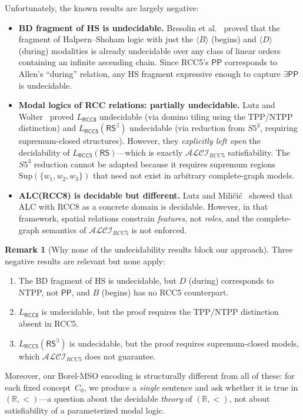 \documentclass[a4paper,11pt]{article}
\theoremstyle{definition}
\newtheorem{remark}[theorem]{Remark}
\newcommand{\ALCIRCC}[1]{\ensuremath{\mathcal{ALCI}_{\mathit{RCC#1}}}}
\newcommand{\PP}{\ensuremath{\mathsf{PP}}}
\newcommand{\reals}{\ensuremath{\mathbb{R}}}
\begin{document}
Unfortunately, the known results are largely negative:
\begin{itemize}[nosep]
  \item \textbf{BD fragment of HS is undecidable.}\; Bresolin et
    al.~\cite{BresolinBD2010} proved that the fragment of
    Halpern--Shoham logic with just the $\langle B\rangle$ (begins)
    and $\langle D\rangle$ (during) modalities is already undecidable
    over any class of linear orders containing an infinite ascending
    chain.  Since RCC5's $\PP$ corresponds to Allen's ``during''
    relation, any HS fragment expressive enough to capture
    $\exists\PP$ is undecidable.
  \item \textbf{Modal logics of RCC relations: partially undecidable.}\;
    Lutz and Wolter~\cite{LutzWolter2006} proved $L_{\mathsf{RCC8}}$
    undecidable (via domino tiling using the TPP/NTPP distinction) and
    $L_{\mathsf{RCC5}}(\mathsf{RS}^{\exists})$ undecidable (via
    reduction from $S5^3$, requiring supremum-closed structures).
    However, they \emph{explicitly left open} the decidability of
    $L_{\mathsf{RCC5}}(\mathsf{RS})$---which is exactly
    $\ALCIRCC{5}$ satisfiability.  The $S5^3$ reduction cannot be
    adapted because it requires supremum regions
    $\mathrm{Sup}(\{w_1,w_2,w_3\})$ that need not exist in arbitrary
    complete-graph models.
  \item \textbf{ALC(RCC8) is decidable but different.}\;
    Lutz and Mili\v{c}i\'{c}~\cite{LutzMilicic2007} showed that
    ALC with RCC8 as a concrete domain is decidable.  However, in
    that framework, spatial relations constrain \emph{features}, not
    \emph{roles}, and the complete-graph semantics of $\ALCIRCC{5}$
    is not enforced.
\end{itemize}

\begin{remark}[Why none of the undecidability results block our approach]
Three negative results are relevant but none apply:
\begin{enumerate}[nosep]
  \item The BD fragment of HS is undecidable, but $D$ (during)
    corresponds to NTPP, not $\PP$, and $B$ (begins) has no RCC5
    counterpart.
  \item $L_{\mathsf{RCC8}}$ is undecidable, but the proof requires the
    TPP/NTPP distinction absent in RCC5.
  \item $L_{\mathsf{RCC5}}(\mathsf{RS}^{\exists})$ is undecidable, but
    the proof requires supremum-closed models, which $\ALCIRCC{5}$ does
    not guarantee.
\end{enumerate}
Moreover, our Borel-MSO encoding is structurally different from all of
these: for each fixed concept~$C_0$, we produce a \emph{single} sentence
and ask whether it is true in $(\reals, <)$---a question about the
decidable \emph{theory} of $(\reals, <)$, not about satisfiability of
a parameterized modal logic.
\end{remark}
\end{document}
